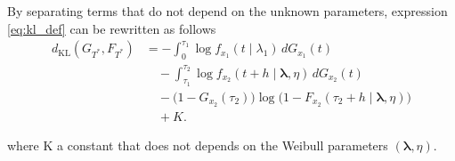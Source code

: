\documentclass{article}
\begin{document}
By separating terms that do not depend on the unknown parameters, expression \eqref{eq:kl_def} can be rewritten as follows
\begin{equation}
\begin{aligned}
d_{\mathrm{KL}}\!\left(
G_{T^{\ast}}, F_{T^{\ast}}
\right)
&=
- \int_{0}^{\tau_1}
\log f_{x_1}(t \mid \lambda_1)\,
dG_{x_1}(t)
\\
&
\quad- \int_{\tau_1}^{\tau_2}
\log f_{x_2}(t+h \mid \boldsymbol{\lambda},\eta)\,
dG_{x_2}(t)
\\
&
\quad- \bigl(1-G_{x_2}(\tau_2)\bigr)
\log\!\bigl(
1-F_{x_2}(\tau_2+h \mid \boldsymbol{\lambda},\eta)
\bigr)
\\
&
\quad+ K .
\end{aligned}
\end{equation}

where K a constant that does not depends on the Weibull parameters $(\boldsymbol{\lambda}, \eta).$
\end{document}
